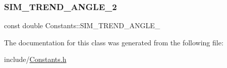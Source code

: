 \mbox{\label{class_constants_a1ec9cdffb9c58a2ff1cb60f64b056835}} 
\subsubsection{\texorpdfstring{SIM\_TREND\_ANGLE\_2}{SIM\_TREND\_ANGLE\_2}}
{\footnotesize\ttfamily const double Constants\+::\+S\+I\+M\+\_\+\+T\+R\+E\+N\+D\+\_\+\+A\+N\+G\+L\+E\+\_\hspace{0.3cm}{\ttfamily [static]}}



The documentation for this class was generated from the following file\+:\begin{DoxyCompactItemize}
\item 
include/\mbox{\hyperlink{_constants_8h}{Constants.\+h}}\end{DoxyCompactItemize}

